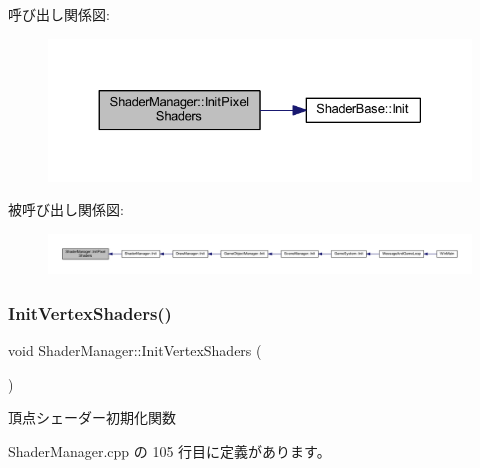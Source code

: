 呼び出し関係図\+:
\nopagebreak
\begin{figure}[H]
\begin{center}
\leavevmode
\includegraphics[width=330pt]{class_shader_manager_a6e1c2dc6c381081bc0e5ef1624b8e0f0_cgraph}
\end{center}
\end{figure}
被呼び出し関係図\+:
\nopagebreak
\begin{figure}[H]
\begin{center}
\leavevmode
\includegraphics[width=350pt]{class_shader_manager_a6e1c2dc6c381081bc0e5ef1624b8e0f0_icgraph}
\end{center}
\end{figure}
\mbox{\label{class_shader_manager_a9881e89daff32662e10f6ac48212ca06}} 
\subsubsection{\texorpdfstring{Init\+Vertex\+Shaders()}{InitVertexShaders()}}
{\footnotesize\ttfamily void Shader\+Manager\+::\+Init\+Vertex\+Shaders (\begin{DoxyParamCaption}{ }\end{DoxyParamCaption})\hspace{0.3cm}{\ttfamily [private]}}



頂点シェーダー初期化関数 



 Shader\+Manager.\+cpp の 105 行目に定義があります。

